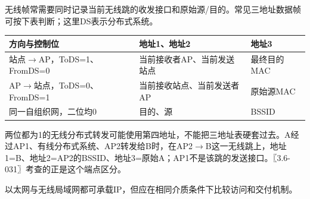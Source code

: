 无线帧常需要同时记录当前无线跳的收发接口和原始源/目的。常见三地址数据帧可按下表判断；这里DS表示分布式系统。

\begin{wideblock}

\par\medskip\noindent\begin{minipage}{\linewidth}\fontsize{9.3}{12}\selectfont\begin{tabularx}{\linewidth}{@{}YYY@{}}
\toprule\noalign{}
方向与控制位 & 地址1、地址2 & 地址3 \\
\midrule\noalign{}


站点\ensuremath{\to}AP，ToDS=1、FromDS=0 & 当前接收者AP、当前发送站点 & 最终目的MAC \\
AP\ensuremath{\to}站点，ToDS=0、FromDS=1 & 当前接收站点、当前发送者AP & 原始源MAC \\
同一自组织网，二位均0 & 目的、源 & BSSID \\
\bottomrule\end{tabularx}
\end{minipage}\par\medskip

\end{wideblock}

两位都为1的无线分布式转发可能使用第四地址，不能把三地址表硬套过去。A经过AP1、有线分布式系统、AP2转发给B时，在AP2\ensuremath{\to}B这一无线跳上，地址1=B、地址2=AP2的BSSID、地址3=原始A；AP1不是该跳的发送接口。〖3.6-031〗考查的正是这个端点区分。

以太网与无线局域网都可承载IP，但应在相同介质条件下比较访问和交付机制。

